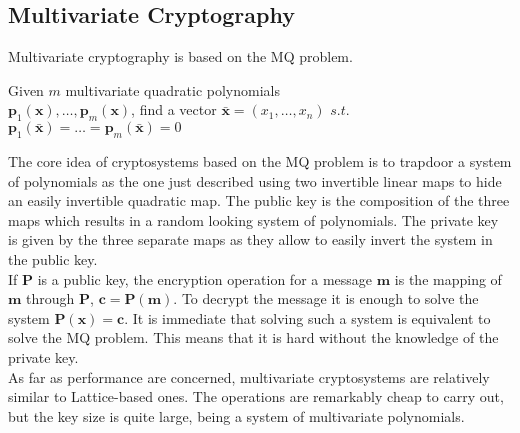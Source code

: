 \subsection{Multivariate Cryptography}
Multivariate cryptography is based on the MQ problem.
\begin{definition}[MQ Problem]
Given $m$ multivariate quadratic polynomials\\ \mbox{$\mathbf{p}_1(\mathbf{x}),\ldots,\mathbf{p}_m(\mathbf{x})$}, find a vector $\bar{\mathbf{x}}=(x_1,\ldots,x_n)$ $s.t.$ $\mathbf{p}_1(\bar{\mathbf{x}})=\ldots=\mathbf{p}_m(\bar{\mathbf{x}})=0$
\end{definition}
The core idea of cryptosystems based on the MQ problem is to trapdoor a system of polynomials as the one just described using two invertible linear maps to hide an easily invertible quadratic map. The public key is the composition of the three maps which results in a random looking system of polynomials. The private key is given by the three separate maps as they allow to easily invert the system in the public key.\\
If $\mathbf{P}$ is a public key, the encryption operation for a message $\mathbf{m}$ is the mapping of $\mathbf{m}$ through $\mathbf{P}$, $\mathbf{c}=\mathbf{P}(\mathbf{m})$. To decrypt the message it is enough to solve the system $\mathbf{P}(\mathbf{x})=\mathbf{c}$. It is immediate that solving such a system is equivalent to solve the MQ problem. This means that it is hard without the knowledge of the private key.\\
As far as performance are concerned, multivariate cryptosystems are relatively similar to Lattice-based ones. The operations are remarkably cheap to carry out, but the key size is quite large, being a system of multivariate polynomials.

